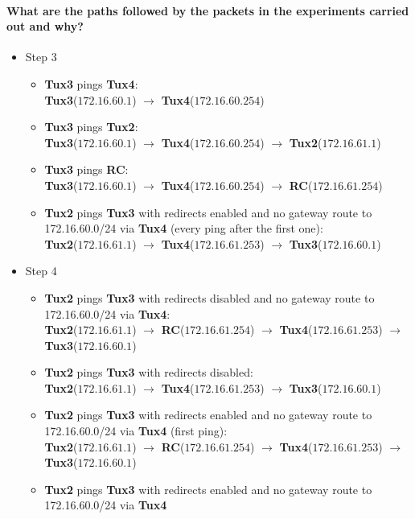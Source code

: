 \documentclass[11pt]{report}
\newcommand{\tux}[1]{\textbf{Tux#1}}
\begin{document}
\paragraph{What are the paths followed by the packets in the experiments carried out and why?}
\begin{itemize}
  \item Step 3
  \begin{itemize}
    \item \tux{3} pings \tux{4}:\\
      \tux{3}($172.16.60.1$) $\rightarrow$ \tux{4}($172.16.60.254$)
    \item \tux{3} pings \tux{2}:\\
      \tux{3}($172.16.60.1$) $\rightarrow$ \tux{4}($172.16.60.254$) $\rightarrow$
      \tux{2}($172.16.61.1$)
    \item \tux{3} pings \textbf{RC}:\\
      \tux{3}($172.16.60.1$) $\rightarrow$ \tux{4}($172.16.60.254$) $\rightarrow$
      \textbf{RC}($172.16.61.254$)
    \item \tux{2} pings \tux{3} with redirects enabled and no gateway route to 172.16.60.0/24 via \tux{4}
      (every ping after the first one):\\
      \tux{2}($172.16.61.1$) $\rightarrow$ \tux{4}($172.16.61.253$) $\rightarrow$ \tux{3}($172.16.60.1$)
  \end{itemize}
  \item Step 4
  \begin{itemize}
    \item \tux{2} pings \tux{3} with redirects disabled and no gateway route to 172.16.60.0/24 via \tux{4}:\\
      \tux{2}($172.16.61.1$) $\rightarrow$ \textbf{RC}($172.16.61.254$) $\rightarrow$
      \tux{4}($172.16.61.253$) $\rightarrow$ \tux{3}($172.16.60.1$)
    \item \tux{2} pings \tux{3} with redirects disabled:\\
      \tux{2}($172.16.61.1$) $\rightarrow$ \tux{4}($172.16.61.253$) $\rightarrow$
      \tux{3}($172.16.60.1$)
    \item \tux{2} pings \tux{3} with redirects enabled and no gateway route to 172.16.60.0/24 via \tux{4} (first ping):\\
      \tux{2}($172.16.61.1$) $\rightarrow$ \textbf{RC}($172.16.61.254$) $\rightarrow$
      \tux{4}($172.16.61.253$) $\rightarrow$ \tux{3}($172.16.60.1$)
    \item \tux{2} pings \tux{3} with redirects enabled and no gateway route to 172.16.60.0/24 via \tux{4}

\end{itemize}
\end{itemize}
\end{document}
